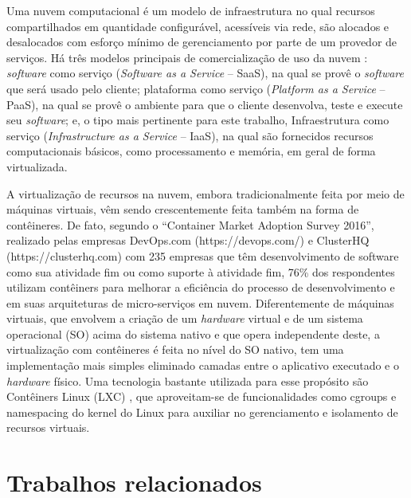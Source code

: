 \documentclass[conference]{IEEEtran}
\begin{document}
Uma nuvem computacional é um modelo de infraestrutura no qual recursos compartilhados em quantidade configurável, acessíveis via rede, são alocados e desalocados com esforço mínimo de gerenciamento por parte de um provedor de serviços. \cite{NIST2011}
%
Há três modelos principais de comercialização de uso da nuvem \cite{NIST2011}: \textit{software} como serviço (\textit{Software as a Service} -- SaaS), na qual se provê o \textit{software} que será usado pelo cliente; plataforma como serviço (\textit{Platform as a Service} -- PaaS), na qual se provê o ambiente para que o cliente desenvolva, teste e execute seu \textit{software}; e, o tipo mais pertinente para este trabalho, Infraestrutura como serviço (\textit{Infrastructure as a Service} -- IaaS), na qual são fornecidos recursos computacionais básicos, como processamento e memória, em geral de forma virtualizada.


A virtualização de recursos na nuvem, embora tradicionalmente feita por meio de máquinas virtuais, vêm sendo crescentemente feita também na forma de contêineres.
%
De fato, segundo o ``Container Market Adoption Survey 2016'', realizado pelas empresas DevOps.com (https://devops.com/) e ClusterHQ (https://clusterhq.com) com 235 empresas que têm desenvolvimento de software como sua atividade fim ou como suporte à atividade fim, 76\% dos respondentes utilizam contêiners para melhorar a eficiência do processo de desenvolvimento e em suas arquiteturas de micro-serviços em nuvem.
%
Diferentemente de máquinas virtuais, que envolvem a criação de um \textit{hardware} virtual e de um sistema operacional (SO) acima do sistema nativo e que opera independente deste, a virtualização com contêineres é feita no nível do SO nativo, tem uma implementação mais simples eliminado camadas entre o aplicativo executado e o \textit{hardware} físico.
%
Uma tecnologia bastante utilizada para esse propósito são Contêiners Linux (LXC) \cite{Linuxcontainers.org2015}, que aproveitam-se de funcionalidades como cgroups e namespacing do kernel do Linux para auxiliar no gerenciamento e isolamento de recursos virtuais.



\section{Trabalhos relacionados}
\label{sec:related}
\end{document}
